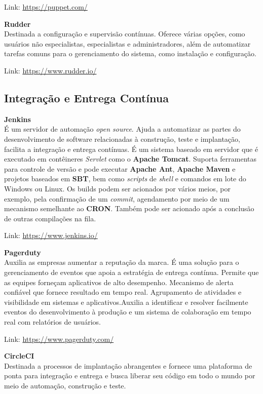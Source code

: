 \documentclass[fleqn,10pt]{../sty/SelfArx} %
\begin{document}
Link: \url{https://puppet.com/}

\textbf{Rudder} \\
Destinada a configuração e supervisão contínuas. Oferece várias opções, como usuários não especialistas, especialistas e administradores, além de automatizar tarefas comuns para o gerenciamento do sistema, como instalação e configuração.

Link: \url{https://www.rudder.io/}

\subsection*{Integração e Entrega Contínua}

\textbf{Jenkins} \\
É um servidor de automação \textit{open source}. Ajuda a automatizar as partes do desenvolvimento de software relacionadas à construção, teste e implantação, facilita a integração e entrega contínuas. É um sistema baseado em servidor que é executado em contêineres \textit{Servlet} como o \textbf{Apache Tomcat}. Suporta ferramentas para controle de versão e pode executar \textbf{Apache Ant}, \textbf{Apache Maven} e projetos baseados em \textbf{SBT}, bem como \textit{scripts} de \textit{shell} e comandos em lote do Windows ou Linux. Os builds podem ser acionados por vários meios, por exemplo, pela confirmação de um \textit{commit}, agendamento por meio de um mecanismo semelhante ao \textbf{CRON}. Também pode ser acionado após a conclusão de outras compilações na fila.

Link: \url{https://www.jenkins.io/}

\textbf{Pagerduty} \\
Auxilia as empresas aumentar a reputação da marca. É uma solução para o gerenciamento de eventos que apoia a estratégia de entrega contínua. Permite que as equipes forneçam aplicativos de alto desempenho. Mecanismo de alerta confiável que fornece resultado em tempo real. Agrupamento de atividades e visibilidade em sistemas e aplicativos.Auxilia a identificar e resolver facilmente eventos do desenvolvimento à produção e um sistema de colaboração em tempo real com relatórios de usuários.

Link: \url{https://www.pagerduty.com/}

\textbf{CircleCI} \\
Destinada a processos de implantação abrangentes e fornece uma plataforma de ponta para integração e entrega e busca liberar seu código em todo o mundo por meio de automação, construção e teste.
\end{document}
